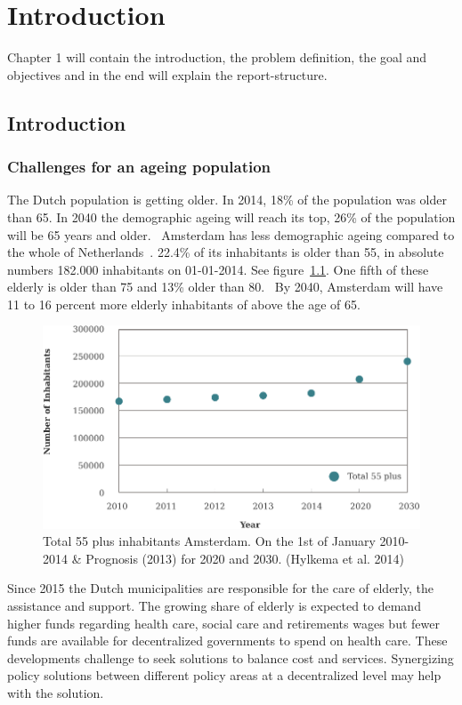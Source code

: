 \chapter[Introduction]{Introduction}
Chapter 1 will contain the introduction, the problem definition, the goal and objectives and in the end will explain the report-structure.

\section[Introduction]{Introduction}
\subsection{Challenges for an ageing population}
The Dutch population is getting older. In 2014, 18\% of the population was older than 65. In 2040 the demographic ageing will reach its top, 26\% of the population will be 65 years and older.~\cite{Hylkema2014} Amsterdam has less demographic ageing compared to the whole of Netherlands~\cite{Hylkema2014}. 22.4\% of its inhabitants is older than 55, in absolute numbers 182.000 inhabitants on 01-01-2014. See figure~\ref{demo}. One fifth of these elderly is older than 75 and 13\% older than 80.~\cite{Hylkema2014} By 2040, Amsterdam will have 11 to 16 percent more elderly inhabitants of above the age of 65. 

\begin{figure}[h]
\includegraphics[width=\textwidth]{img/I1_number_elderly.pdf}
\centering
\caption[Total 55 plus inhabitants Amsterdam.]{
Total 55 plus inhabitants Amsterdam. On the 1st of January 2010-2014 \& Prognosis (2013) for 2020 and 2030. (Hylkema et al. 2014)} 
\label{demo}
\end{figure} 

Since 2015 the Dutch municipalities are responsible for the care of elderly, the assistance and support. The growing share of elderly is expected to demand higher funds regarding health care, social care and retirements wages but fewer funds are available for decentralized governments to spend on health care. These developments challenge to seek solutions to balance cost and services. Synergizing policy solutions between different policy areas at a decentralized level may help with the solution.~\cite{Hylkema2014} 

